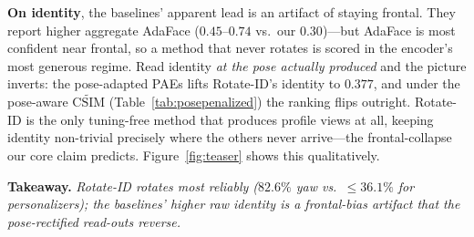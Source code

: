 \textbf{On identity}, the baselines' apparent lead is an artifact of staying
frontal. They report higher aggregate AdaFace \csim{} ($0.45$--$0.74$ vs.\ our
$0.30$)---but AdaFace is most confident near frontal, so a method that never
rotates is scored in the encoder's most generous regime. Read identity \emph{at
the pose actually produced} and the picture inverts: the pose-adapted PAEs
lifts Rotate-ID's identity to $0.377$, and under the pose-aware
$\widetilde{\mathrm{CSIM}}$ (Table~\ref{tab:posepenalized}) the ranking flips
outright. 
Rotate-ID is the only tuning-free method that produces profile views
at all, keeping identity non-trivial precisely where the others never
arrive---the frontal-collapse our core claim predicts. Figure~\ref{fig:teaser}
shows this qualitatively.

\noindent\textbf{Takeaway.} \emph{Rotate-ID rotates most reliably ($82.6\%$ yaw
vs.\ $\le36.1\%$ for personalizers); the baselines' higher raw identity is a
frontal-bias artifact that the pose-rectified read-outs reverse.}

